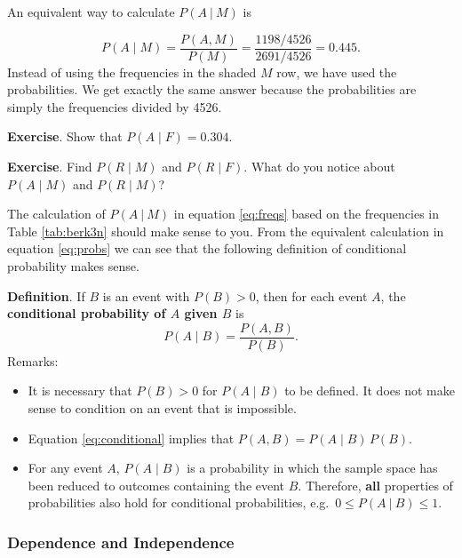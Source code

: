 \documentclass[
  11pt,
  british,
  openany, a4paper]{book}
\providecommand{\tightlist}{%
  \setlength{\itemsep}{0pt}\setlength{\parskip}{0pt}}
\begin{document}
An equivalent way to calculate \(P(A~|~M)\) is

\begin{equation}
P(A \mid M) = \frac{P(A, M)}{P(M)} = \frac{1198/4526}{2691/4526} = 0.445. \label{eq:probs}
\end{equation}
Instead of using the frequencies in the shaded \(M\) row, we have used the probabilities. We get exactly the same answer because the probabilities are simply the frequencies divided by 4526.

\textbf{Exercise}. Show that \(P(A \mid F)=0.304\).

\textbf{Exercise}. Find \(P(R \mid M)\) and \(P(R \mid F)\). What do you notice about \(P(A \mid M)\) and \(P(R \mid M)\)?

The calculation of \(P(A~|~M)\) in equation \eqref{eq:freqs} based on the frequencies in Table \ref{tab:berk3n} should make sense to you. From the equivalent calculation in equation \eqref{eq:probs} we can see that the following definition of conditional probability makes sense.

\textbf{Definition}. If \(B\) is an event with \(P(B) > 0\), then for each event \(A\), the \textbf{conditional probability of \(A\) given \(B\)} is
\begin{equation}
P(A \mid B)=\frac{P(A , B)}{P(B)}.
\label{eq:conditional}
\end{equation}
Remarks:

\begin{itemize}
\tightlist
\item
  It is necessary that \(P(B) > 0\) for \(P(A \mid B)\) to be defined. It does not make sense to condition on an event that is impossible.
\item
  Equation \eqref{eq:conditional} implies that \(P(A , B) = P(A \mid B)\,P(B)\).
\item
  For any event \(A\), \(P(A \mid B)\) is a probability in which the sample space has been reduced to outcomes containing the event \(B\). Therefore, \textbf{all} properties of probabilities also hold for conditional probabilities, e.g.~\(0 \leq P(A~|~B) \leq 1\).
\end{itemize}

\hypertarget{dependence-and-independence}{%
\subsubsection*{Dependence and Independence}\label{dependence-and-independence}}
\end{document}
